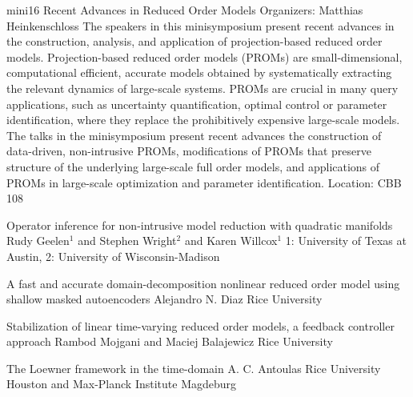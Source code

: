 \mini
{mini16}
{Recent Advances in Reduced Order Models}
{Organizers: Matthias Heinkenschloss}
{The speakers in this minisymposium present recent advances in the construction, analysis, and application of projection-based reduced order models. Projection-based reduced order models (PROMs) are small-dimensional, computational efficient, accurate models obtained by systematically extracting the relevant dynamics of large-scale systems. PROMs are crucial in many query applications, such as uncertainty quantification, optimal control or parameter identification, where they replace the prohibitively expensive large-scale models. The talks in the minisymposium present recent advances the construction of data-driven, non-intrusive PROMs, modifications of PROMs that preserve structure of the underlying large-scale full order models, and applications of PROMs in large-scale optimization and parameter identification.}
{Location: CBB 108}

\begin{talks}
\item\talk
{Operator inference for non-intrusive model reduction with quadratic manifolds}
{Rudy Geelen$^{1}$ and Stephen Wright$^{2}$ and Karen Willcox$^{1}$}
{1: University of Texas at Austin, 2: University of Wisconsin-Madison}
\item\talk
{A fast and accurate domain-decomposition nonlinear reduced order model using shallow masked autoencoders}
{Alejandro N. Diaz}
{Rice University}
\item\talk
{Stabilization of linear time-varying reduced order models, a feedback controller approach}
{Rambod Mojgani and Maciej Balajewicz}
{Rice University}
\item\talk
{The Loewner framework in the time-domain}
{A. C. Antoulas}
{Rice University Houston and Max-Planck Institute Magdeburg}
\end{talks}
\room
